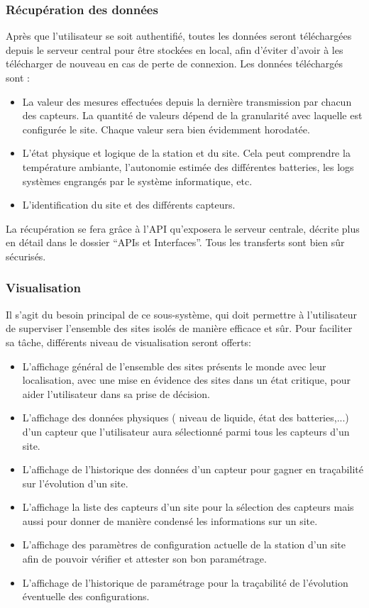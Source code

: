 \subsubsection{Récupération des données}
Après que l'utilisateur se soit authentifié, toutes les données seront téléchargées depuis le serveur central pour être stockées en local, afin d'éviter d'avoir à les télécharger de nouveau en cas de perte de connexion. Les données téléchargés sont :
\begin{itemize}
\item La valeur des mesures effectuées depuis la dernière transmission par chacun des capteurs. La quantité de valeurs dépend de la granularité avec laquelle est configurée le site. Chaque valeur sera bien évidemment horodatée.
\item L'état physique et logique de la station et du site. Cela peut comprendre la température ambiante, l'autonomie estimée des différentes batteries, les logs systèmes engrangés par le système informatique, etc.
\item L'identification du site et des différents capteurs. %
\end{itemize}
La récupération se fera grâce à l'API qu'exposera le serveur centrale, décrite plus en détail dans le dossier ``APIs et Interfaces''. Tous les transferts sont bien sûr sécurisés.

\subsubsection{Visualisation}
Il s'agit du besoin principal de ce sous-système, qui doit permettre à l'utilisateur de superviser l'ensemble des sites isolés de manière efficace et sûr. Pour faciliter sa tâche, différents niveau de visualisation seront offerts:
\begin{itemize}
	\item L'affichage général de l'ensemble des sites présents le monde avec leur localisation, avec une mise en évidence des sites dans un état critique, pour aider l'utilisateur dans sa prise de décision.
	\item L'affichage des données physiques ( niveau de liquide, état des batteries,...) d'un capteur que l'utilisateur aura sélectionné parmi tous les capteurs d'un site.
	\item L'affichage de l'historique des données d'un capteur pour gagner en traçabilité sur l'évolution d'un site.
	\item L'affichage la liste des capteurs d'un site pour la sélection des capteurs mais aussi pour donner de manière condensé les informations sur un site.
	\item L'affichage des paramètres de configuration actuelle de la station d'un site afin de pouvoir vérifier et attester son bon paramétrage.
	\item L'affichage de l'historique de paramétrage pour la traçabilité de l'évolution éventuelle des configurations.
\end{itemize}

